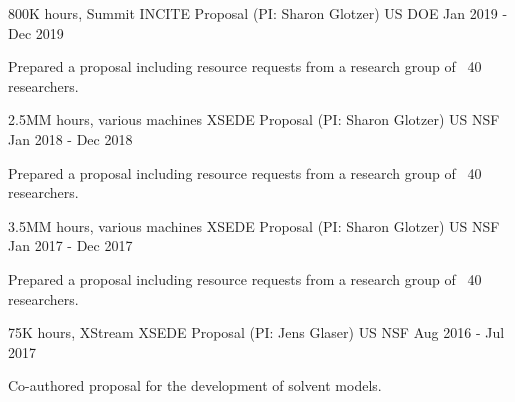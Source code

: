 \begin{cventries}
  \cventry
    {800K hours, Summit} %
    {INCITE Proposal (PI: Sharon Glotzer)} %
    {US DOE} %
    {Jan 2019 - Dec 2019} %
    {
      \begin{cvitems}
        \item Prepared a proposal including resource requests from a research group of ~40 researchers.
      \end{cvitems}
    }

  \cventry
    {2.5MM hours, various machines} %
    {XSEDE Proposal (PI: Sharon Glotzer)} %
    {US NSF} %
    {Jan 2018 - Dec 2018} %
    {
      \begin{cvitems}
        \item Prepared a proposal including resource requests from a research group of ~40 researchers.
      \end{cvitems}
    }

  \cventry
    {3.5MM hours, various machines} %
    {XSEDE Proposal (PI: Sharon Glotzer)} %
    {US NSF} %
    {Jan 2017 - Dec 2017} %
    {
      \begin{cvitems}
        \item Prepared a proposal including resource requests from a research group of ~40 researchers.
      \end{cvitems}
    }

  \cventry
    {75K hours, XStream} %
    {XSEDE Proposal (PI: Jens Glaser)} %
    {US NSF} %
    {Aug 2016 - Jul 2017} %
    {
      \begin{cvitems}
        \item Co-authored proposal for the development of solvent models.
      \end{cvitems}
    }

\end{cventries}